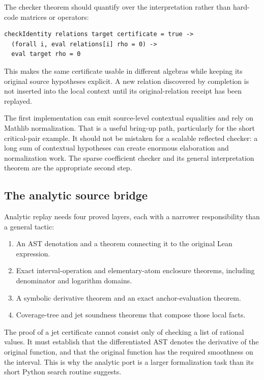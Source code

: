 The checker theorem should quantify over the interpretation rather than hard-code matrices or operators:
\par\noindent\begin{minipage}{\linewidth}
\begin{lstlisting}
checkIdentity relations target certificate = true ->
  (forall i, eval relations[i] rho = 0) ->
  eval target rho = 0
\end{lstlisting}
\end{minipage}\par
This makes the same certificate usable in different algebras while keeping its original source hypotheses explicit. A new relation discovered by completion is not inserted into the local context until its original-relation receipt has been replayed.

The first implementation can emit source-level contextual equalities and rely on Mathlib normalization. That is a useful bring-up path, particularly for the short critical-pair example. It should not be mistaken for a scalable reflected checker: a long sum of contextual hypotheses can create enormous elaboration and normalization work. The sparse coefficient checker and its general interpretation theorem are the appropriate second step.

\subsection{The analytic source bridge}
Analytic replay needs four proved layers, each with a narrower responsibility than a general tactic:
\begin{enumerate}
\item An AST denotation and a theorem connecting it to the original Lean expression.
\item Exact interval-operation and elementary-atom enclosure theorems, including denominator and logarithm domains.
\item A symbolic derivative theorem and an exact anchor-evaluation theorem.
\item Coverage-tree and jet soundness theorems that compose those local facts.
\end{enumerate}
The proof of a jet certificate cannot consist only of checking a list of rational values. It must establish that the differentiated AST denotes the derivative of the original function, and that the original function has the required smoothness on the interval. This is why the analytic port is a larger formalization task than its short Python search routine suggests.

